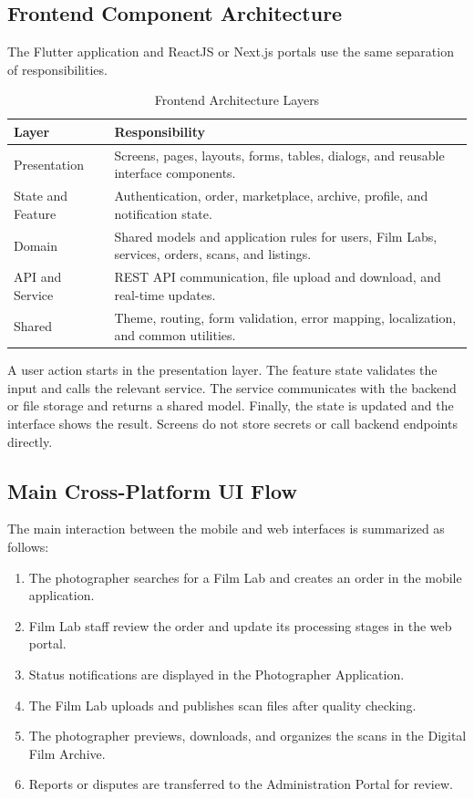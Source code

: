 \subsection{Frontend Component Architecture}

The Flutter application and ReactJS or Next.js portals use the same separation
of responsibilities.

\begin{table}[htbp]
\centering
\small
\renewcommand{\arraystretch}{1.1}
\caption{Frontend Architecture Layers}
\label{tab:frontend-architecture-layers}
\begin{tabular}{|p{3.2cm}|p{9.4cm}|}
\hline
\textbf{Layer} & \textbf{Responsibility} \\
\hline
Presentation & Screens, pages, layouts, forms, tables, dialogs, and reusable
interface components. \\
\hline
State and Feature & Authentication, order, marketplace, archive, profile, and
notification state. \\
\hline
Domain & Shared models and application rules for users, Film Labs, services,
orders, scans, and listings. \\
\hline
API and Service & REST API communication, file upload and download, and
real-time updates. \\
\hline
Shared & Theme, routing, form validation, error mapping, localization, and
common utilities. \\
\hline
\end{tabular}
\end{table}

A user action starts in the presentation layer. The feature state validates the
input and calls the relevant service. The service communicates with the backend
or file storage and returns a shared model. Finally, the state is updated and
the interface shows the result. Screens do not store secrets or call backend
endpoints directly.

\subsection{Main Cross-Platform UI Flow}

The main interaction between the mobile and web interfaces is summarized as
follows:

\begin{enumerate}
    \item The photographer searches for a Film Lab and creates an order in the
    mobile application.
    \item Film Lab staff review the order and update its processing stages in
    the web portal.
    \item Status notifications are displayed in the Photographer Application.
    \item The Film Lab uploads and publishes scan files after quality checking.
    \item The photographer previews, downloads, and organizes the scans in the
    Digital Film Archive.
    \item Reports or disputes are transferred to the Administration Portal for
    review.
\end{enumerate}


